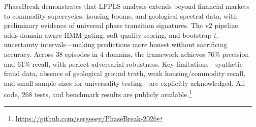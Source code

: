 \documentclass[11pt,a4paper]{article}
\begin{document}
PhaseBreak demonstrates that LPPLS analysis extends beyond financial markets to commodity supercycles, housing booms, and geological spectral data, with preliminary evidence of universal phase transition signatures. The v2 pipeline adds domain-aware HMM gating, soft quality scoring, and bootstrap $t_c$ uncertainty intervals---making predictions more honest without sacrificing accuracy. Across 38 episodes in 4 domains, the framework achieves 76\% precision and 61\% recall, with perfect adversarial robustness. Key limitations---synthetic fraud data, absence of geological ground truth, weak housing/commodity recall, and small sample sizes for universality testing---are explicitly acknowledged. All code, 268 tests, and benchmark results are publicly available.\footnote{\url{https://github.com/sergeeey/PhaseBreak-2026}}



\end{document}
